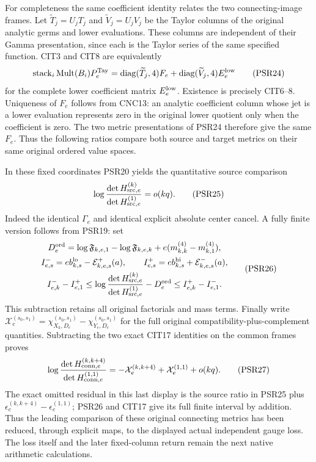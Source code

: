 \documentclass[10pt]{article}
\begin{document}
For completeness the same coefficient identity relates the two
connecting-image frames. Let $\widetilde T_j=U_jT_j$ and
$\widetilde V_j=U_jV_j$ be the Taylor columns of the original
analytic germs and lower evaluations. These columns are independent
of their Gamma presentation, since each is the Taylor series of
the same specified function. CIT3 and CIT8 are equivalently
\[
 \operatorname{stack}_i\operatorname{Mult}(B_i)P_e^{\rm Tay}
   =\operatorname{diag}(\widetilde T_j,4)F_e
                   +\operatorname{diag}(\widetilde V_j,4)E_e^{\rm low}
\tag{PSR24}
\]
for the complete lower coefficient matrix $E_e^{\rm low}$.
Existence is precisely CIT6--8. Uniqueness of $F_e$ follows from
CNC13: an analytic coefficient column whose jet is a lower
evaluation represents zero in the original lower quotient only
when the coefficient is zero. The two metric presentations of
PSR24 therefore give the same $F_e$. Thus the following ratios
compare both source and target metrics on their same original
ordered value spaces.

In these fixed coordinates PSR20 yields the quantitative source
comparison
\[
 \log\frac{\det H_{{\rm src},e}^{(k)}}
                   {\det H_{{\rm src},e}^{(1)}}=o(kq).
\tag{PSR25}
\]
Indeed the identical $\Gamma_e$ and identical explicit absolute
center cancel. A fully finite version follows from PSR19:
set
\[
\begin{gathered}
 D_e^{\rm ord}=\log\mathfrak F_{k,e,1}-\log\mathfrak F_{k,e,k}
                 +e(m^{(4)}_{k,k}-m^{(4)}_{k,1}),\\
 I_{e,s}^-=e b_{k,s}^{\rm lo}-\mathcal E^+_{k,e,s}(a),\qquad
 I_{e,s}^+=e b_{k,s}^{\rm hi}+\mathcal E^-_{k,e,s}(a),\\
 I_{e,k}^- -I_{e,1}^+
 \le\log\frac{\det H_{{\rm src},e}^{(k)}}
                   {\det H_{{\rm src},e}^{(1)}}-D_e^{\rm ord}
 \le I_{e,k}^+-I_{e,1}^- .
\end{gathered}\tag{PSR26}
\]
This subtraction retains all original factorials and mass terms.
Finally write $\mathcal X_e^{(s_0,s_1)}
=\chi_{X_k,D_e}^{(s_0,s_1)}-\chi_{Y_e,D_e}^{(s_0,s_1)}$ for the
full original compatibility-plus-complement quantities. Subtracting
the two exact CIT17 identities on the common frames proves
\[
 \log\frac{\det H_{{\rm conn},e}^{(k,k+4)}}
                   {\det H_{{\rm conn},e}^{(1,1)}}
 =-\mathcal X_e^{(k,k+4)}+\mathcal X_e^{(1,1)}+o(kq).
\tag{PSR27}
\]
The exact omitted residual in this last display is the source ratio
in PSR25 plus $\epsilon_e^{(k,k+4)}-\epsilon_e^{(1,1)}$; PSR26
and CIT17 give its full finite interval by addition. Thus the
leading comparison of these original connecting metrics has been
reduced, through explicit maps, to the displayed actual independent
gauge loss. The loss itself and the later fixed-column return remain
the next native arithmetic calculations.

\end{document}
